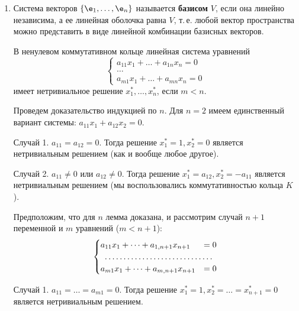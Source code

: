 \begin{enumerate}
\item Система векторов $\{\e_1,\dots,\e_n\}$ называется \textbf{базисом} $V$, если она линейно независима, а ее линейная оболочка равна $V$, т.\,е. любой вектор пространства можно представить в виде линейной комбинации базисных векторов.

\begin{lem} В ненулевом коммутативном кольце линейная система уравнений
$$
\begin{cases}
a_{11}x_1+\dots+a_{1n}x_n=0 \\
\dots \\
a_{m1}x_1+\dots+a_{mn}x_n=0
\end{cases}
$$
имеет нетривиальное решение $x_1^*,\dots,x_n^*$, если $m<n$.
\end{lem}
\pf Проведем доказательство индукцией по $n$. Для $n=2$ имеем единственный вариант системы: $a_{11}x_1+a_{12}x_2=0$.

Случай 1. $a_{11}=a_{12}=0$. Тогда решение $x_1^*=1, x_2^*=0$ является нетривиальным решением (как и вообще любое другое).

Случай 2. $a_{11}\ne 0$ или $a_{12}\ne 0$. Тогда решение $x_1^*=a_{12}, x_2^*=-a_{11}$ является нетривиальным решением (мы воспользовались коммутативностью кольца $K$).

Предположим, что для $n$ лемма доказана, и рассмотрим случай $n+1$ переменной и $m$ уравнений ($m<n+1$):
\begin{equation}\label{systema2}
\begin{cases}
a_{11}x_1+\dots+a_{1,n+1}x_{n+1} &= 0 \\
\hdotsfor{2} \\
a_{m1}x_1+\dots+a_{m,n+1}x_{n+1} &= 0
\end{cases}
\end{equation}

Случай 1. $a_{11}=\dots=a_{m1}=0$. Тогда решение $x_1^*=1, x_2^*=\dots=x_{n+1}^*=0$ является нетривиальным решением.


\end{enumerate}
